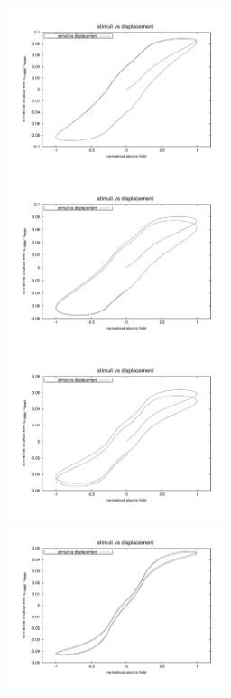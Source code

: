 \begin{figure}
\centering 
{}
{\includegraphics[width=2.5in]{./chap_5_active_trusses/truss_freq_study/truss_nonlinear_freq_0p1.pdf}}
{\includegraphics[width=2.5in]{./chap_5_active_trusses/truss_freq_study/truss_nonlinear_freq_0p2.pdf}}
{\includegraphics[width=2.5in]{./chap_5_active_trusses/truss_freq_study/truss_nonlinear_freq_0p5.pdf}}
{\includegraphics[width=2.5in]{./chap_5_active_trusses/truss_freq_study/truss_nonlinear_freq_2p0.pdf}}

\end{figure}
